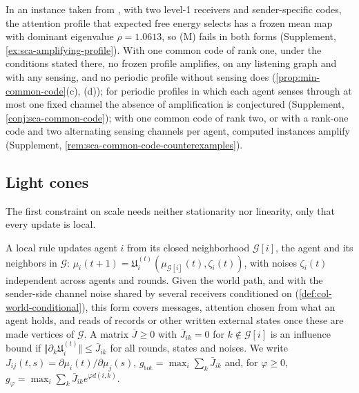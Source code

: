 In an instance taken from \citet{dennis2026communicating}, with two level-1 receivers and sender-specific codes, the attention profile that expected free energy selects has a frozen mean map with dominant eigenvalue $\rho=1.0613$, so \textup{(M)} fails in both forms (Supplement, \cref{ex:sca-amplifying-profile}). With one common code of rank one, under the conditions stated there, no frozen profile amplifies, on any listening graph and with any sensing, and no periodic profile without sensing does (\cref{prop:min-common-code}(c), (d)); for periodic profiles in which each agent senses through at most one fixed channel the absence of amplification is conjectured (Supplement, \cref{conj:sca-common-code}); with one common code of rank two, or with a rank-one code and two alternating sensing channels per agent, computed instances amplify (Supplement, \cref{rem:sca-common-code-counterexamples}).

\subsection{Light cones}\label{sec:sca-lightcone}

The first constraint on scale needs neither stationarity nor linearity, only that every update is local.

\begin{definition}\label{def:sca-local-rule}
A local rule updates agent $i$ from its closed neighborhood $\mathcal G[i]$, the agent and its neighbors in $\mathcal G$: $\mu_i(t+1)=\mathfrak U^{(t)}_i(\mu_{\mathcal G[i]}(t),\zeta_i(t))$, with noises $\zeta_i(t)$ independent across agents and rounds. Given the world path, and with the sender-side channel noise shared by several receivers conditioned on (\cref{def:col-world-conditional}), this form covers messages, attention chosen from what an agent holds, and reads of records or other written external states once these are made vertices of $\mathcal G$. A matrix $\bar J\ge0$ with $\bar J_{ik}=0$ for $k\notin\mathcal G[i]$ is an influence bound if $\Vert\partial_k\mathfrak U^{(t)}_i\Vert\le\bar J_{ik}$ for all rounds, states and noises. We write $J_{ij}(t,s)=\partial\mu_i(t)/\partial\mu_j(s)$, $g_{\mathrm{tot}}=\max_i\sum_k\bar J_{ik}$ and, for $\varphi\ge0$, $g_\varphi=\max_i\sum_k\bar J_{ik}e^{\varphi d(i,k)}$.
\end{definition}

